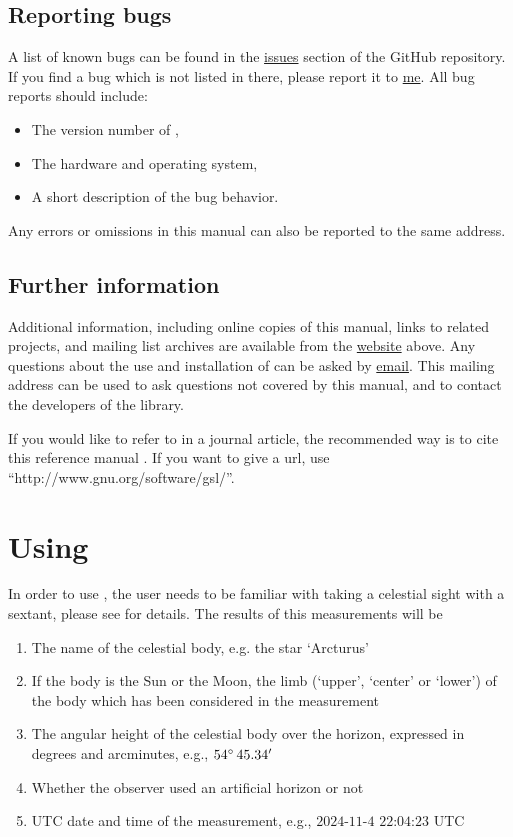 \documentclass{ol-softwaremanual}
\begin{document}
\subsection{Reporting bugs}

A list of known bugs can be found in the \href{https://github.com/mcastel1/thelemacus/issues}{issues} section of the GitHub repository.
If you find a bug which is not listed in there, please report it to \href{mailto:michele.castellana@gmail.com}{me}. All bug reports should include:
\begin{itemize}
    \item The version number of \thel, 
    \item The hardware and operating system, 
    \item A short description of the bug behavior. 

\end{itemize}

Any errors or omissions in this manual can also be reported to the same address.


\subsection{Further information}


Additional information, including online copies of this manual, links to related projects, and mailing list archives are available from the \href{https://sites.google.com/site/michelecastellana/home}{website}  above.
Any questions about the use and installation of \thel can be asked by \href{mailto:michele.castellana@gmail.com}{email}. This mailing address can be used to ask questions not covered by this manual, and to contact the developers of the library.

If you would like to refer to \thel in a journal article, the recommended way is to cite this reference manual \cite{castellana2024thelemacus-documentation}. If you want to give a url, use “http://www.gnu.org/software/gsl/”.



\section{Using \thel}

In order to use \thel, the user needs to be familiar with taking a celestial sight with a sextant, please see \cite{bowditch2002the} for details. The results of this measurements will be 
\begin{enumerate}
\item The name of the celestial body, e.g. the star `Arcturus'
\item If the body is the Sun or the Moon, the limb (`upper', `center' or `lower') of the body which has been considered in the measurement
\item The angular height of the celestial body over the horizon, expressed in degrees and arcminutes, e.g., $54 \degree \, 45.34'$
\item Whether the observer used an artificial horizon or not
\item \ac{UTC} date and time of the measurement, e.g., $2024$-$11$-$4$ $22$:$04$:$23$ \ac{UTC}
\end{enumerate}
\end{document}
